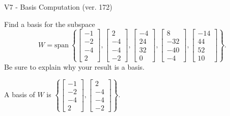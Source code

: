 \begin{exercise}
  \begin{exerciseTitle}V7 - Basis Computation (ver. 172)\end{exerciseTitle}
  \begin{exerciseStatement}
    Find a basis for the subspace 
\[W=\mathrm{span}\ \left\{\left[\begin{array}{r}
-1 \\
-2 \\
-4 \\
2
\end{array}\right] , \left[\begin{array}{r}
2 \\
-4 \\
-4 \\
-2
\end{array}\right] , \left[\begin{array}{r}
-4 \\
24 \\
32 \\
0
\end{array}\right] , \left[\begin{array}{r}
8 \\
-32 \\
-40 \\
-4
\end{array}\right] , \left[\begin{array}{r}
-14 \\
44 \\
52 \\
10
\end{array}\right]\right\}.\]
 Be sure to explain why your result is a basis.


  \end{exerciseStatement}
  \begin{exerciseAnswer}
   A basis of \(W\) is  \(\left\{\left[\begin{array}{r}
-1 \\
-2 \\
-4 \\
2
\end{array}\right] , \left[\begin{array}{r}
2 \\
-4 \\
-4 \\
-2
\end{array}\right]\right\}\).
  


  \end{exerciseAnswer}
\end{exercise}